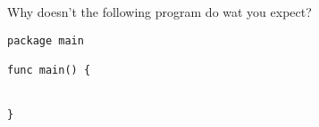 \begin{Exercise}[title={Scope},difficulty=4]
\label{ex:calc}
\Question\label{ex:scope q1} Why doesn't the following program do
wat you expect?

\begin{lstlisting}
package main

func main() {


}
\end{lstlisting}

\end{Exercise}

\begin{Answer}
\Question


\end{Answer}

